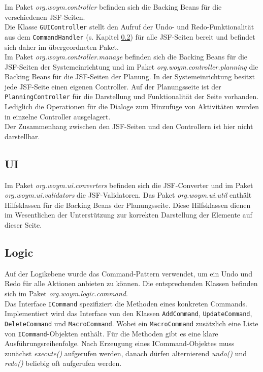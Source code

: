 \documentclass[fontsize=12pt,paper=a4,twoside]{scrartcl}
\begin{document}
Im Paket \textit{org.woym.controller} befinden sich die Backing Beans für die verschiedenen JSF-Seiten. \\
Die Klasse \texttt{GUIController} stellt den Aufruf der Undo- und Redo-Funktionalität aus dem \texttt{CommandHandler} (s. Kapitel \ref{subsec:logic}) für alle JSF-Seiten bereit und befindet sich daher im übergeordneten Paket.\\
Im Paket \textit{org.woym.controller.manage} befinden sich die Backing Beans für die JSF-Seiten der Systemeinrichtung und im Paket \textit{org.woym.controller.planning} die Backing Beans für die JSF-Seiten der Planung. In der Systemeinrichtung besitzt jede JSF-Seite einen eigenen Controller. Auf der Planungsseite ist der \texttt{PlanningController} für die Darstellung und Funktionalität der Seite vorhanden. Lediglich die Operationen für die Dialoge zum Hinzufüge von Aktivitäten wurden in einzelne Controller ausgelagert.\\
Der Zusammenhang zwischen den JSF-Seiten und den Controllern ist hier nicht darstellbar.





\subsection{UI}
\label{subsec:UI}

Im Paket \textit{org.woym.ui.converters} befinden sich die JSF-Converter und im Paket \textit{org.woym.ui.validators} die JSF-Validatoren. Das Paket \textit{org.woym.ui.util} enthält Hilfsklassen für die Backing Beans der Planungsseite. Diese Hilfsklassen dienen im Wesentlichen der Unterstützung zur korrekten Darstellung der Elemente auf dieser Seite.\clearpage




\subsection{Logic}
\label{subsec:logic}
Auf der Logikebene wurde das Command-Pattern verwendet, um ein Undo und Redo für alle Aktionen anbieten zu können. Die entsprechenden Klassen befinden sich im Paket \textit{org.woym.logic.command}. \\
Das Interface \texttt{ICommand} spezifiziert die Methoden eines konkreten Commands. Implementiert wird das Interface von den Klassen \texttt{AddCommand}, \texttt{UpdateCommand}, \texttt{DeleteCommand} und \texttt{MacroCommand}. Wobei ein \texttt{MacroCommand} zusätzlich eine Liste von \texttt{ICommand}-Objekten enthält. Für die Methoden gibt es eine klare Ausführungsreihenfolge. Nach Erzeugung eines ICommand-Objektes muss zunächst \textit{execute()} aufgerufen werden, danach dürfen alternierend \textit{undo()} und \textit{redo()} beliebig oft aufgerufen werden. \\
\end{document}
